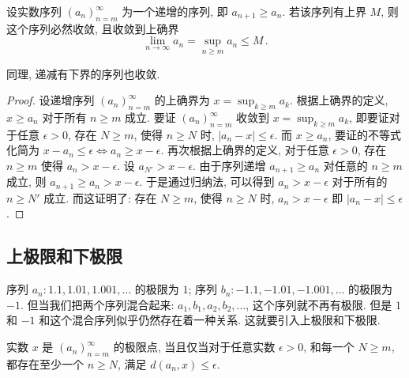 \documentclass[UTF8]{ctexart}
\theoremstyle{mystyle}
\theoremstyle{myremark}
\theoremstyle{plain}
\begin{document}
\begin{theorem} \label{monotone convergence}
    设实数序列 $ (a_n)_{n = m}^\infty $ 为一个递增的序列, 即 $ a_{n+1} \geqslant a_n $. 若该序列有上界 $ M $, 则这个序列必然收敛, 且收敛到上确界 \[ \lim\limits_{n \to \infty} a_n = \sup\limits_{n \geqslant m} a_n \leqslant M \,.\]
\end{theorem}

同理, 递减有下界的序列也收敛.

\begin{proof}
    设递增序列 $ (a_n)_{n = m}^\infty $ 的上确界为 $ x = \sup_{k \geqslant m} a_k $. 根据上确界的定义, $ x \geqslant a_n $ 对于所有 $ n \geqslant m $ 成立. 要证 $ (a_n)_{n = m}^\infty $ 收敛到 $ x = \sup_{k \geqslant m} a_k $, 即要证对于任意 $ \epsilon > 0 $, 存在 $ N \geqslant m $, 使得 $ n \geqslant N $ 时, $ |a_n - x| \leqslant \epsilon $. 而 $ x \geqslant a_n $, 要证的不等式化简为 $ x - a_n \leqslant \epsilon \Longleftrightarrow  a_n \geqslant x - \epsilon $. 再次根据上确界的定义, 对于任意 $ \epsilon > 0 $, 存在 $ n \geqslant m $ 使得 $ a_n > x - \epsilon $. 设 $ a_{N'} > x - \epsilon $. 由于序列递增 $ a_{n + 1} \geqslant a_n $ 对任意的 $ n \geqslant m $ 成立, 则 $ a_{n + 1} \geqslant a_n > x - \epsilon $. 于是通过归纳法, 可以得到 $ a_n > x - \epsilon $ 对于所有的 $ n \geqslant N' $ 成立. 而这证明了: 存在 $ N \geqslant m $, 使得 $ n \geqslant N $ 时, $ a_n > x - \epsilon $ 即 $ |a_n - x| \leqslant \epsilon $.
\end{proof}


\subsection{上极限和下极限}
序列 $ a_n \colon 1.1, 1.01, 1.001, \dots $ 的极限为 $ 1 $; 序列 $ b_n \colon -1.1, -1.01, -1.001, \dots $ 的极限为 $ -1 $. 但当我们把两个序列混合起来: $ a_1, b_1, a_2, b_2, \dots $, 这个序列就不再有极限. 但是 $ 1 $ 和 $ -1 $ 和这个混合序列似乎仍然存在着一种关系. 这就要引入上极限和下极限.

\begin{definition}
    实数 $ x $ 是 $ (a_n)_{n = m}^{\infty} $ 的极限点, 当且仅当对于任意实数 $ \epsilon > 0 $, 和每一个 $ N \geqslant m $, 都存在至少一个 $ n \geqslant N $, 满足 $ d(a_n, x) \leqslant \epsilon $. 
\end{definition}
\end{document}
